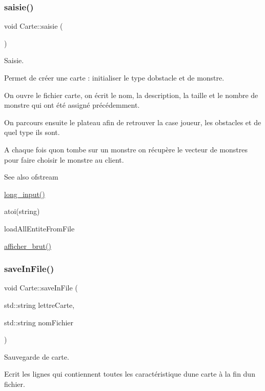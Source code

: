 \subsubsection{\texorpdfstring{saisie()}{saisie()}}
{\footnotesize\ttfamily void Carte\+::saisie (\begin{DoxyParamCaption}{ }\end{DoxyParamCaption})}



Saisie. 

Permet de créer une carte \+: initialiser le type d\textquotesingle{}obstacle et de monstre.

On ouvre le fichier carte, on écrit le nom, la description, la taille et le nombre de monstre qui ont été assigné précédemment.

On parcours ensuite le plateau afin de retrouver la case joueur, les obstacles et de quel type ils sont.

A chaque fois qu\textquotesingle{}on tombe sur un monstre on récupère le vecteur de monstres pour faire choisir le monstre au client.

\begin{DoxySeeAlso}{See also}
ofstream 

\hyperlink{namespaceio_ab044be3afd7ac04eeb1a496af0f1d5c6}{long\+\_\+input()} 

atoi(string) 

load\+All\+Entite\+From\+File 

\hyperlink{class_carte_a4f7a245946c6d2044b35f2137985746b}{afficher\+\_\+brut()} 
\end{DoxySeeAlso}
\mbox{\label{class_carte_a7f49f6e2b7f6cbb7daef97b31f66af48}} 
\subsubsection{\texorpdfstring{save\+In\+File()}{saveInFile()}}
{\footnotesize\ttfamily void Carte\+::save\+In\+File (\begin{DoxyParamCaption}\item[{std\+::string}]{lettre\+Carte,  }\item[{std\+::string}]{nom\+Fichier }\end{DoxyParamCaption})}



Sauvegarde de carte. 

Ecrit les lignes qui contiennent toutes les caractéristique d\textquotesingle{}une carte à la fin d\textquotesingle{}un fichier.


